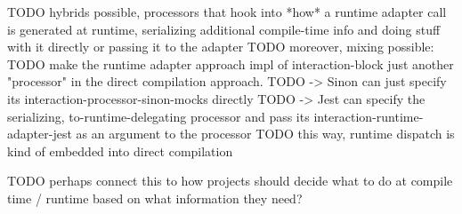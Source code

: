 TODO hybrids possible, processors that hook into *how* a runtime adapter call is generated at runtime, serializing additional compile-time info and doing stuff with it directly or passing it to the adapter
TODO moreover, mixing possible:
TODO    make the runtime adapter approach impl of interaction-block just another "processor" in the direct compilation approach.
TODO    -> Sinon can just specify its interaction-processor-sinon-mocks directly
TODO    -> Jest can specify the serializing, to-runtime-delegating processor and pass its interaction-runtime-adapter-jest as an argument to the processor
TODO    this way, runtime dispatch is kind of embedded into direct compilation

TODO perhaps connect this to how projects should decide what to do at compile time / runtime based on what information they need?
